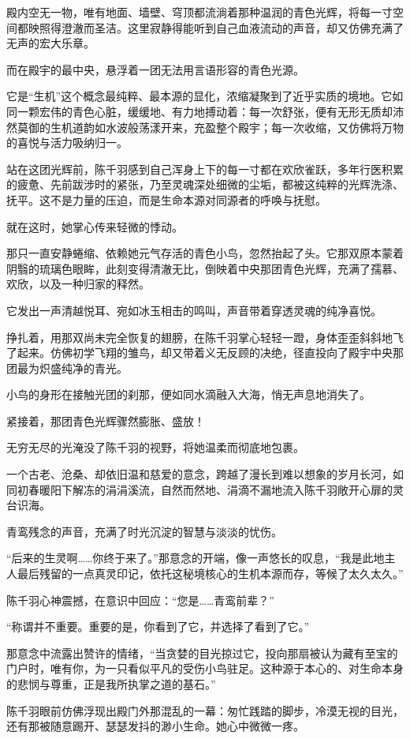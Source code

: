 殿内空无一物，唯有地面、墙壁、穹顶都流淌着那种温润的青色光辉，将每一寸空间都映照得澄澈而圣洁。这里寂静得能听到自己血液流动的声音，却又仿佛充满了无声的宏大乐章。

而在殿宇的最中央，悬浮着一团无法用言语形容的青色光源。

它是“生机”这个概念最纯粹、最本源的显化，浓缩凝聚到了近乎实质的境地。它如同一颗宏伟的青色心脏，缓缓地、有力地搏动着：每一次舒张，便有无形无质却沛然莫御的生机道韵如水波般荡漾开来，充盈整个殿宇；每一次收缩，又仿佛将万物的喜悦与活力吸纳归一。

站在这团光辉前，陈千羽感到自己浑身上下的每一寸都在欢欣雀跃，多年行医积累的疲惫、先前跋涉时的紧张，乃至灵魂深处细微的尘垢，都被这纯粹的光辉洗涤、抚平。这不是力量的压迫，而是生命本源对同源者的呼唤与抚慰。

就在这时，她掌心传来轻微的悸动。

那只一直安静蜷缩、依赖她元气存活的青色小鸟，忽然抬起了头。它那双原本蒙着阴翳的琉璃色眼眸，此刻变得清澈无比，倒映着中央那团青色光辉，充满了孺慕、欢欣，以及一种归家的释然。

它发出一声清越悦耳、宛如冰玉相击的鸣叫，声音带着穿透灵魂的纯净喜悦。

挣扎着，用那双尚未完全恢复的翅膀，在陈千羽掌心轻轻一蹬，身体歪歪斜斜地飞了起来。仿佛初学飞翔的雏鸟，却又带着义无反顾的决绝，径直投向了殿宇中央那团最为炽盛纯净的青光。

小鸟的身形在接触光团的刹那，便如同水滴融入大海，悄无声息地消失了。

紧接着，那团青色光辉骤然膨胀、盛放！

无穷无尽的光淹没了陈千羽的视野，将她温柔而彻底地包裹。

一个古老、沧桑、却依旧温和慈爱的意念，跨越了漫长到难以想象的岁月长河，如同初春暖阳下解冻的涓涓溪流，自然而然地、涓滴不漏地流入陈千羽敞开心扉的灵台识海。

青鸾残念的声音，充满了时光沉淀的智慧与淡淡的忧伤。

“后来的生灵啊……你终于来了。”那意念的开端，像一声悠长的叹息，“我是此地主人最后残留的一点真灵印记，依托这秘境核心的生机本源而存，等候了太久太久。”

陈千羽心神震撼，在意识中回应：“您是……青鸾前辈？”

“称谓并不重要。重要的是，你看到了它，并选择了看到了它。”

那意念中流露出赞许的情绪，“当贪婪的目光掠过它，投向那扇被认为藏有至宝的门户时，唯有你，为一只看似平凡的受伤小鸟驻足。这种源于本心的、对生命本身的悲悯与尊重，正是我所执掌之道的基石。”

陈千羽眼前仿佛浮现出殿门外那混乱的一幕：匆忙践踏的脚步，冷漠无视的目光，还有那被随意踢开、瑟瑟发抖的渺小生命。她心中微微一疼。

